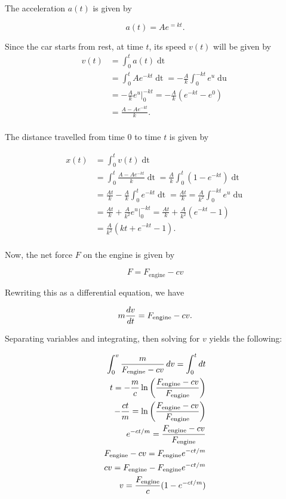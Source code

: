 \documentclass{homework}
\begin{document}
\exercise
The acceleration $a(t)$ is given by 

\begin{equation*}
    a(t) = Ae^{=kt}.
\end{equation*}

Since the car starts from rest, at time $t$, its speed $v(t)$ will be given by
\begin{align*}
    v(t) &= \int_0^t a(t) \mathop{dt} \\
    &= \int_0^t Ae^{-kt} \mathop{dt} = -\frac{A}{k} \int_0^{-kt} e^u \mathop{du} \\
    &= -\frac{A}{k}e^u \big\rvert_0^{-kt} = -\frac{A}{k}(e^{-kt} - e^0) \\
    &= \frac{A - Ae^{-kt}}{k}. \\
\end{align*}

The distance travelled from time $0$ to time $t$ is given by

\begin{align*}
    x(t) &= \int_0^t v(t) \mathop{dt} \\
    &= \int_0^t \frac{A - Ae^{-kt}}{k} \mathop{dt} = \frac{A}{k} \int_0^t (1 - e^{-kt}) \mathop{dt} \\
    &= \frac{At}{k} - \frac{A}{k}\int_0^t e^{-kt} \mathop{dt} = \frac{At}{k} = \frac{A}{k^2} \int_0^{-kt} e^u \mathop{du} \\
    &= \frac{At}{k} + \frac{A}{k^2} e^u \big\rvert_0^{-kt} = \frac{At}{k} + \frac{A}{k^2}(e^{-kt} - 1) \\
    &= \frac{A}{k^2} (kt + e^{-kt} - 1). \\
\end{align*}

Now, the net force $F$ on the engine is given by

\begin{equation*}
    F = F_{\text{engine}} - cv
\end{equation*}

Rewriting this as a differential equation, we have

\begin{equation*}
    m\frac{dv}{dt} = F_{\text{engine}} - cv.
\end{equation*}

Separating variables and integrating, then solving for $v$ yields the following:

\begin{align*}
    \int_0^v \frac{m}{F_{\text{engine}} - cv} \mathop{dv} = \int_0^t \mathop{dt} \\
    t = -\frac{m}{c}\ln\left(\frac{F_{\text{engine}} - cv}{F_{\text{engine}}}\right) \\
    -\frac{ct}{m} = \ln\left(\frac{F_{\text{engine}} - cv}{F_{\text{engine}}}\right) \\
    e^{-ct / m} = \frac{F_{\text{engine}} - cv}{F_{\text{engine}}} \\
    F_{\text{engine}} - cv = F_{\text{engine}} e^{-ct / m} \\
    cv = F_{\text{engine}} - F_{\text{engine}} e^{-ct / m} \\
    v = \frac{F_{\text{engine}}}{c} (1 - e^{-ct / m}) \\
\end{align*}
\end{document}
